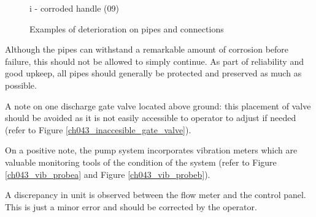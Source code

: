 \begin{figure}[!htb]
\begin{minipage}[b]{0.3\linewidth}
	\caption*{i - corroded handle (09)}
	\label{ch043_prv_corroded_manual_switch}
\end{minipage}
\caption{Examples of deterioration on pipes and connections}
\label{fig_ch04_visualinspection_deterioration01}
\end{figure}











Although the pipes can withstand a remarkable amount of corrosion before failure, this should not be allowed to simply continue. As part of reliability and good upkeep, all pipes should generally be protected and preserved as much as possible.


A note on one discharge gate valve located above ground: this placement of valve should be avoided as it is not easily accessible to operator to adjust if needed (refer to Figure \ref{ch043_inaccesible_gate_valve}).


On a positive note, the pump system incorporates vibration meters which are valuable monitoring tools of the condition of the system (refer to Figure \ref{ch043_vib_probea} and Figure \ref{ch043_vib_probeb}).

A discrepancy in unit is observed between the flow meter and the control panel. This is just a minor error and should be corrected by the operator.

